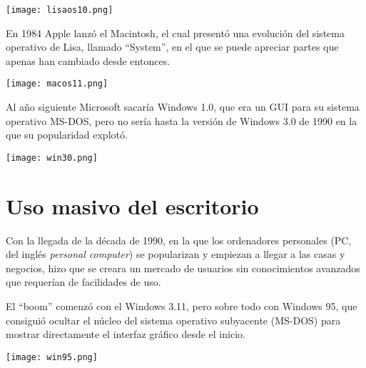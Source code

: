 \vspace{-10pt}
\begin{center}
    \texttt{[image: lisaos10.png]}
\end{center}


En 1984 Apple lanzó el Macintosh, el cual presentó una evolución del sistema operativo de Lisa, llamado “System”, en el que se puede apreciar partes que apenas han cambiado desde entonces.

\vspace{-10pt}
\begin{center}
    \texttt{[image: macos11.png]}
\end{center}


Al año siguiente Microsoft sacaría Windows 1.0, que era un GUI para su sistema operativo MS-DOS, pero no sería hasta la versión de Windows 3.0 de 1990 en la que su popularidad explotó.

\vspace{-10pt}
\begin{center}
    \texttt{[image: win30.png]}
\end{center}


\section{Uso masivo del escritorio}

Con la llegada de la década de 1990, en la que los ordenadores personales (PC, del inglés \textit{personal computer}) se popularizan y empiezan a llegar a las casas y negocios, hizo que se creara un mercado de usuarios sin conocimientos avanzados que requerían de facilidades de uso.

El “boom” comenzó con el Windows 3.11, pero sobre todo con Windows 95, que consiguió ocultar el núcleo del sistema operativo subyacente (MS-DOS) para mostrar directamente el interfaz gráfico desde el inicio.

\vspace{-10pt}
\begin{center}
    \texttt{[image: win95.png]}
\end{center}


